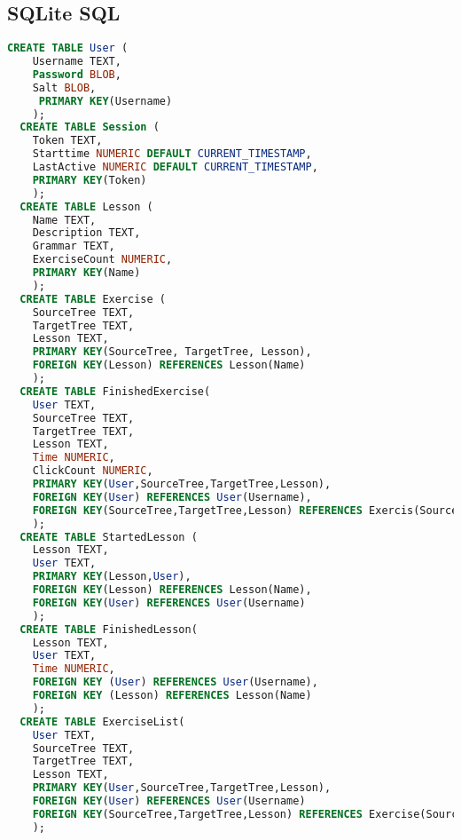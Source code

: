 \documentclass{scrartcl}
\begin{document}
\subsection{SQLite SQL}

\begin{lstlisting}[language=SQL]
  CREATE TABLE User (
    Username TEXT,
    Password BLOB,
    Salt BLOB,
     PRIMARY KEY(Username)
    );
  CREATE TABLE Session (
    Token TEXT,
    Starttime NUMERIC DEFAULT CURRENT_TIMESTAMP,
    LastActive NUMERIC DEFAULT CURRENT_TIMESTAMP,
    PRIMARY KEY(Token)
    );
  CREATE TABLE Lesson (
    Name TEXT,
    Description TEXT,
    Grammar TEXT,
    ExerciseCount NUMERIC,
    PRIMARY KEY(Name)
    );
  CREATE TABLE Exercise (
    SourceTree TEXT,
    TargetTree TEXT,
    Lesson TEXT,
    PRIMARY KEY(SourceTree, TargetTree, Lesson),
    FOREIGN KEY(Lesson) REFERENCES Lesson(Name)
    );
  CREATE TABLE FinishedExercise(
    User TEXT,
    SourceTree TEXT,
    TargetTree TEXT,
    Lesson TEXT,
    Time NUMERIC,
    ClickCount NUMERIC,
    PRIMARY KEY(User,SourceTree,TargetTree,Lesson),
    FOREIGN KEY(User) REFERENCES User(Username),
    FOREIGN KEY(SourceTree,TargetTree,Lesson) REFERENCES Exercis(SourceTree,TargetTree,Lesson)
    );
  CREATE TABLE StartedLesson (
    Lesson TEXT,
    User TEXT,
    PRIMARY KEY(Lesson,User),
    FOREIGN KEY(Lesson) REFERENCES Lesson(Name),
    FOREIGN KEY(User) REFERENCES User(Username)
    );
  CREATE TABLE FinishedLesson(
    Lesson TEXT,
    User TEXT,
    Time NUMERIC,
    FOREIGN KEY (User) REFERENCES User(Username),
    FOREIGN KEY (Lesson) REFERENCES Lesson(Name)
    );
  CREATE TABLE ExerciseList(
    User TEXT,
    SourceTree TEXT,
    TargetTree TEXT,
    Lesson TEXT,
    PRIMARY KEY(User,SourceTree,TargetTree,Lesson),
    FOREIGN KEY(User) REFERENCES User(Username)
    FOREIGN KEY(SourceTree,TargetTree,Lesson) REFERENCES Exercise(SourceTree,TargetTree,Lesson)
    );
\end{lstlisting}
\end{document}
